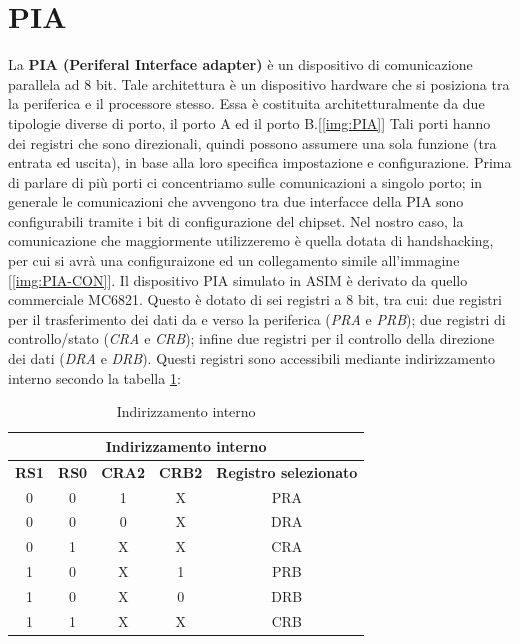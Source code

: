 \section{PIA}
La \textbf{PIA (Periferal Interface adapter)} è un dispositivo di comunicazione parallela ad 8 bit. Tale architettura è un dispositivo hardware che si posiziona tra la periferica e il processore stesso. Essa è costituita architetturalmente da due tipologie diverse di porto, il porto A ed il porto B.[\ref{img:PIA}]
Tali porti hanno dei registri che sono direzionali, quindi possono assumere una sola funzione (tra entrata ed uscita), in base alla loro specifica impostazione e configurazione.
Prima di parlare di più porti ci concentriamo sulle comunicazioni a singolo porto; in generale le comunicazioni che avvengono tra due interfacce della PIA sono configurabili tramite i bit di configurazione del chipset. Nel nostro caso, la comunicazione che maggiormente utilizzeremo è quella dotata di handshacking, per cui si avrà una configuraizone ed un collegamento simile all'immagine [\ref{img:PIA-CON}].
Il dispositivo PIA simulato in ASIM è derivato da quello commerciale MC6821. Questo è dotato di sei registri a 8 bit, tra cui: due registri per il trasferimento dei dati da e verso la periferica (\textit{PRA} e \textit{PRB}); due registri di controllo/stato (\textit{CRA} e \textit{CRB}); infine due registri per il controllo della direzione dei dati (\textit{DRA} e \textit{DRB}). Questi registri sono accessibili mediante indirizzamento interno secondo la tabella \ref{Tab:reg_ind_1}:

\begin{table} [!h]
    \centering
    \begin{tabular}{|c|c|c|c|c|}
        \hline
        \multicolumn{5}{|c|}{\textbf{Indirizzamento interno}} \\ \hline
        \textbf{RS1} & \textbf{RS0} & \textbf{CRA2} & \textbf{CRB2} & \textbf{Registro selezionato}\\ \hline
        0       &0      &1      &X      &PRA    \\  \hline
        0       &0      &0      &X      &DRA    \\  \hline
        0       &1      &X      &X      &CRA    \\  \hline
        1       &0      &X      &1      &PRB    \\  \hline
        1       &0      &X      &0      &DRB    \\  \hline
        1       &1      &X      &X      &CRB    \\  \hline
    \end{tabular}
    \caption{Indirizzamento interno}
    \label{Tab:reg_ind_1}
\end{table}

